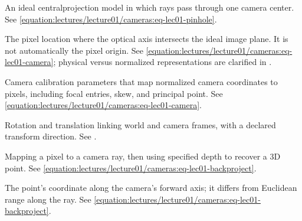 \documentclass[letterpaper,11pt,english,openany,oneside]{jupyterBook}
\begin{document}
\begin{description}
\sphinxAtStartPar
An ideal central\sphinxhyphen{}projection model in which rays pass through one camera center. See \eqref{equation:lectures/lecture01/cameras:eq-lec01-pinhole}.

\sphinxAtStartPar
The pixel location where the optical axis intersects the ideal image plane. It is not automatically the pixel origin. See \eqref{equation:lectures/lecture01/cameras:eq-lec01-camera}; physical versus normalized representations are clarified in {\hyperref[\detokenize{lectures/lecture03/calibration:lec03-calibration}]{}}.

\sphinxAtStartPar
Camera calibration parameters that map normalized camera coordinates to pixels, including focal entries, skew, and principal point. See \eqref{equation:lectures/lecture01/cameras:eq-lec01-camera}.

\sphinxAtStartPar
Rotation and translation linking world and camera frames, with a declared transform direction. See {\hyperref[\detokenize{lectures/lecture01/cameras:lec01-cameras}]{}}.

\sphinxAtStartPar
Mapping a pixel to a camera ray, then using specified depth to recover a 3D point. See \eqref{equation:lectures/lecture01/cameras:eq-lec01-backproject}.

\sphinxAtStartPar
The point’s coordinate along the camera’s forward axis; it differs from Euclidean range along the ray. See \eqref{equation:lectures/lecture01/cameras:eq-lec01-backproject}.

\end{description}
\end{document}
